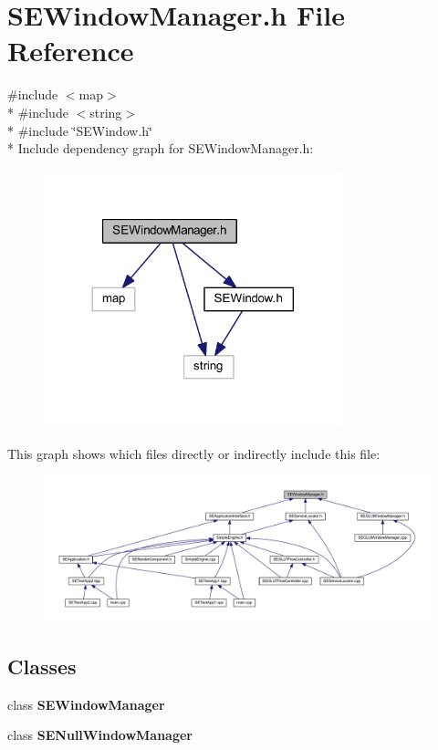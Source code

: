 \section{S\+E\+Window\+Manager.\+h File Reference}
\label{_s_e_window_manager_8h}
{\ttfamily \#include $<$map$>$}\\*
{\ttfamily \#include $<$string$>$}\\*
{\ttfamily \#include \char`\"{}S\+E\+Window.\+h\char`\"{}}\\*
Include dependency graph for S\+E\+Window\+Manager.\+h\+:
\nopagebreak
\begin{figure}[H]
\begin{center}
\leavevmode
\includegraphics[width=245pt]{_s_e_window_manager_8h__incl}
\end{center}
\end{figure}
This graph shows which files directly or indirectly include this file\+:
\nopagebreak
\begin{figure}[H]
\begin{center}
\leavevmode
\includegraphics[width=350pt]{_s_e_window_manager_8h__dep__incl}
\end{center}
\end{figure}
\subsection*{Classes}
\begin{DoxyCompactItemize}
\item 
class {\bf S\+E\+Window\+Manager}
\item 
class {\bf S\+E\+Null\+Window\+Manager}
\end{DoxyCompactItemize}
